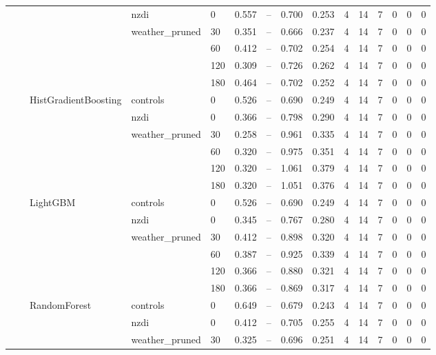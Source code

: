 \begin{longtable}{lllllrrrrrrrrrr}
\cline{4-15}
 &  &  & nzdi & 0 & 0.557 & -- & 0.700 & 0.253 & 4 & 14 & 7 & 0 & 0 & 0 \\
\cline{4-15}
 &  &  & \multirow[t]{4}{*}{weather_pruned} & 30 & 0.351 & -- & 0.666 & 0.237 & 4 & 14 & 7 & 0 & 0 & 0 \\
 &  &  &  & 60 & 0.412 & -- & 0.702 & 0.254 & 4 & 14 & 7 & 0 & 0 & 0 \\
 &  &  &  & 120 & 0.309 & -- & 0.726 & 0.262 & 4 & 14 & 7 & 0 & 0 & 0 \\
 &  &  &  & 180 & 0.464 & -- & 0.702 & 0.252 & 4 & 14 & 7 & 0 & 0 & 0 \\
\cline{3-15} \cline{4-15}
 &  & \multirow[t]{6}{*}{HistGradientBoosting} & controls & 0 & 0.526 & -- & 0.690 & 0.249 & 4 & 14 & 7 & 0 & 0 & 0 \\
\cline{4-15}
 &  &  & nzdi & 0 & 0.366 & -- & 0.798 & 0.290 & 4 & 14 & 7 & 0 & 0 & 0 \\
\cline{4-15}
 &  &  & \multirow[t]{4}{*}{weather_pruned} & 30 & 0.258 & -- & 0.961 & 0.335 & 4 & 14 & 7 & 0 & 0 & 0 \\
 &  &  &  & 60 & 0.320 & -- & 0.975 & 0.351 & 4 & 14 & 7 & 0 & 0 & 0 \\
 &  &  &  & 120 & 0.320 & -- & 1.061 & 0.379 & 4 & 14 & 7 & 0 & 0 & 0 \\
 &  &  &  & 180 & 0.320 & -- & 1.051 & 0.376 & 4 & 14 & 7 & 0 & 0 & 0 \\
\cline{3-15} \cline{4-15}
 &  & \multirow[t]{6}{*}{LightGBM} & controls & 0 & 0.526 & -- & 0.690 & 0.249 & 4 & 14 & 7 & 0 & 0 & 0 \\
\cline{4-15}
 &  &  & nzdi & 0 & 0.345 & -- & 0.767 & 0.280 & 4 & 14 & 7 & 0 & 0 & 0 \\
\cline{4-15}
 &  &  & \multirow[t]{4}{*}{weather_pruned} & 30 & 0.412 & -- & 0.898 & 0.320 & 4 & 14 & 7 & 0 & 0 & 0 \\
 &  &  &  & 60 & 0.387 & -- & 0.925 & 0.339 & 4 & 14 & 7 & 0 & 0 & 0 \\
 &  &  &  & 120 & 0.366 & -- & 0.880 & 0.321 & 4 & 14 & 7 & 0 & 0 & 0 \\
 &  &  &  & 180 & 0.366 & -- & 0.869 & 0.317 & 4 & 14 & 7 & 0 & 0 & 0 \\
\cline{3-15} \cline{4-15}
 &  & \multirow[t]{6}{*}{RandomForest} & controls & 0 & 0.649 & -- & 0.679 & 0.243 & 4 & 14 & 7 & 0 & 0 & 0 \\
\cline{4-15}
 &  &  & nzdi & 0 & 0.412 & -- & 0.705 & 0.255 & 4 & 14 & 7 & 0 & 0 & 0 \\
\cline{4-15}
 &  &  & \multirow[t]{4}{*}{weather_pruned} & 30 & 0.325 & -- & 0.696 & 0.251 & 4 & 14 & 7 & 0 & 0 & 0 \\

\end{longtable}
